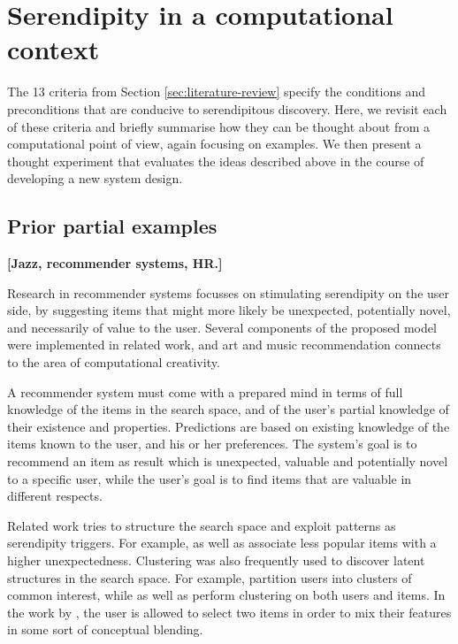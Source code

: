 \section{Serendipity in a computational context} \label{sec:computational-serendipity}

The 13 criteria from Section \ref{sec:literature-review} specify the
conditions and preconditions that are conducive to serendipitous
discovery.  Here, we revisit each of these criteria and briefly
summarise how they can be thought about from a computational point of
view, again focusing on examples.  We then present a thought
experiment that evaluates the ideas described above in the course of
developing a new system design.

% 

\subsection{Prior partial examples}

\textbf{[Jazz, recommender systems, HR.]}

Research in recommender systems focusses on stimulating serendipity on the user side, by suggesting items that might more likely be unexpected, potentially novel, and necessarily of value to the user. Several components of the proposed model were implemented in related work, and art and music recommendation connects to the area of computational creativity.

A recommender system must come with a prepared mind in terms of full knowledge of the items in the search space, and of the user's partial knowledge of their existence and properties. Predictions are based on existing knowledge of the items known to the user, and his or her preferences. The system's goal is to recommend an item as result which is unexpected, valuable and potentially novel to a specific user, while the user's goal is to find items that are valuable in different respects. 

Related work tries to structure the search space and exploit patterns as serendipity triggers. For example, \cite{Herlocker2004} as well as \cite{Lu2012} associate less popular items with a higher unexpectedness. Clustering was also frequently used to discover latent structures in the search space. For example, \cite{Kamahara2005} partition users into clusters of common interest, while \cite{Onuma2009} as well as \cite{Zhang2011} perform clustering on both users and items. In the work by \cite{Oku2011}, the user is allowed to select two items in order to mix their features in some sort of conceptual blending. 

